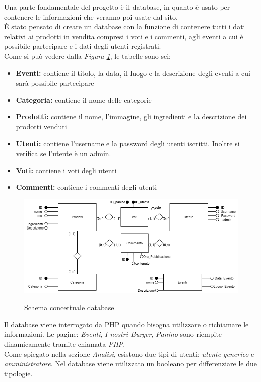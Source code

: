 Una parte fondamentale del progetto è il database, in quanto è usato per contenere le informazioni che veranno poi usate dal sito.\\
È stato pensato di creare un database con la funzione di contenere tutti i dati relativi ai prodotti in vendita compresi i voti e i commenti, agli eventi a cui è possibile partecipare e i dati degli utenti registrati.\\
Come si può vedere dalla \emph{Figura \ref{Fig:schemadb}}, le tabelle sono sei:
\begin{itemize}
		\item \textbf{Eventi:} contiene il titolo, la data, il luogo e la descrizione degli eventi a cui sarà possibile partecipare
		\item \textbf{Categoria:} contiene il nome delle categorie
		\item \textbf{Prodotti:} contiene il nome, l'immagine, gli ingredienti e la descrizione dei prodotti venduti
		\item \textbf{Utenti:} contiene l'username e la password degli utenti iscritti. Inoltre si verifica se l'utente è un admin.
        \item \textbf{Voti:} contiene i voti degli utenti
        \item \textbf{Commenti:} contiene i commenti degli utenti
\end{itemize}
\begin{figure}[!h]
	\centering	%
	\includegraphics[width=0.7\linewidth]{../database/DiagrammaER.png}\\
    \caption{Schema concettuale database}
	\label{Fig:schemadb}
\end{figure}
Il database viene interrogato da PHP quando bisogna utilizzare o richiamare le informazioni.
Le pagine: \emph{Eventi}, \emph{I nostri Burger}, \emph{Panino} sono riempite dinamicamente tramite chiamata \emph{PHP}.\\
Come spiegato nella sezione \emph{Analisi}, esistono due tipi di utenti: \emph{utente generico} e \emph{amministratore}. Nel database viene utilizzato un booleano per differenziare le due tipologie.\\ 
